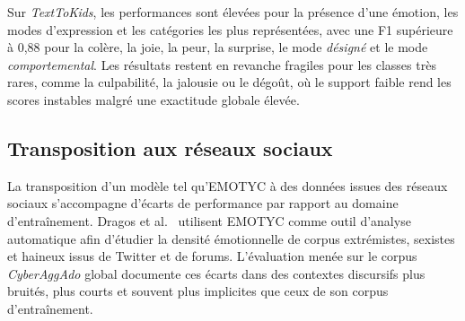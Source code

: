 \FloatBarrier

Sur \textit{TextToKids}, les performances sont élevées pour la présence d'une émotion, les modes d'expression et les catégories les plus représentées, avec une F1 supérieure à 0,88 pour la colère, la joie, la peur, la surprise, le mode \textit{désigné} et le mode \textit{comportemental}. Les résultats restent en revanche fragiles pour les classes très rares, comme la culpabilité, la jalousie ou le dégoût, où le support faible rend les scores instables malgré une exactitude globale élevée.

\FloatBarrier

\subsection*{Transposition aux réseaux sociaux}

La transposition d'un modèle tel qu'EMOTYC à des données issues des réseaux sociaux s'accompagne d'écarts de performance par rapport au domaine d'entraînement. Dragos et al.~\citep{dragos2024exploring} utilisent EMOTYC comme outil d'analyse automatique afin d'étudier la densité émotionnelle de corpus extrémistes, sexistes et haineux issus de Twitter et de forums. L'évaluation menée sur le corpus \textit{CyberAggAdo} global documente ces écarts dans des contextes discursifs plus bruités, plus courts et souvent plus implicites que ceux de son corpus d'entraînement.

